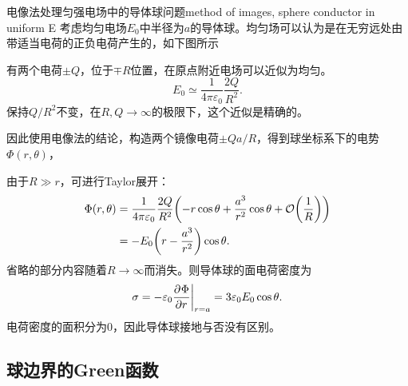 \begin{example}{电像法处理匀强电场中的导体球问题}{method of images, sphere conductor in uniform E}
    考虑均匀电场$E_0$中半径为$a$的导体球。均匀场可以认为是在无穷远处由带适当电荷的正负电荷产生的，如下图所示
    \begin{notecaptionblock}
        \label{fig:uniform E approx pm q}
    \end{notecaptionblock}
    有两个电荷$\pm Q$，位于$\mp R$位置，在原点附近电场可以近似为均匀。
    \[
        E_0 \simeq \frac1{4\pi\varepsilon_0}\frac{2Q}{R^2}.
    \]
    保持$Q/R^2$不变，在$R,Q \to \infty$的极限下，这个近似是精确的。

    因此使用电像法的结论，构造两个镜像电荷$\pm Qa/R$，得到球坐标系下的电势$\Phi(r,\theta)$，

    由于$R \gg r$，可进行Taylor展开：
    \begin{align}
        \notag
        \Phi(r,\theta) &= \frac1{4\pi\varepsilon_0}\frac{2Q}{R^2}\biggl(-r\cos\theta + \frac{a^3}{r^2}\cos\theta + \mathcal{O}\biggl(\frac1R\biggr)\biggr)\\
        &= -E_0\biggl(r - \frac{a^3}{r^2}\biggr)\cos\theta.
    \end{align}
    省略的部分内容随着$R \to \infty$而消失。则导体球的面电荷密度为
    \begin{equation}
        \sigma = -\varepsilon_0{\frac{\partial^{}\Phi}{\partial{r}^{}}}\biggr\rvert_{r=a} = 3\varepsilon_0E_0\cos\theta.
    \end{equation}
    电荷密度的面积分为0，因此导体球接地与否没有区别。
\end{example}

\subsection{球边界的Green函数}
\label{ssec:Green function, sphere}

